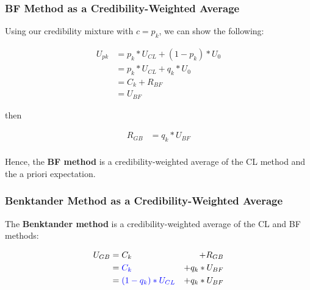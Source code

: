 \documentclass{article}
\begin{document}
\subsubsection{BF Method as a Credibility-Weighted Average}

Using our credibility mixture with $c = p_k$, we can show the following:

\begin{equation}
  \begin{aligned}
    U_{pk} &= p_k * U_{CL} + (1 - p_k) * U_0 \\
    &= p_k * U_{CL} + q_k * U_0 \\
    &= C_k + R_{BF} \\
    &= U_{BF}
  \end{aligned}
\end{equation}

then

\begin{equation}
  \begin{aligned}
    R_{GB} &= q_k * U_{BF} \\
  \end{aligned}
\end{equation}

Hence, the \textbf{BF method} is a credibility-weighted average of the CL method
and the a priori expectation.

\subsubsection{Benktander Method as a Credibility-Weighted Average}

The \textbf{Benktander method} is a credibility-weighted average of the CL and
BF methods:

\begin{equation}
  \begin{aligned}
    U_{GB} &= C_k & + R_{GB} \\
    &= \color{blue}{C_k} & + q_k * U_{BF} \\
    &= \color{blue}{(1-q_k) * U_{CL}} & + q_k * U_{BF} \\
  \end{aligned}
\end{equation}
\end{document}
